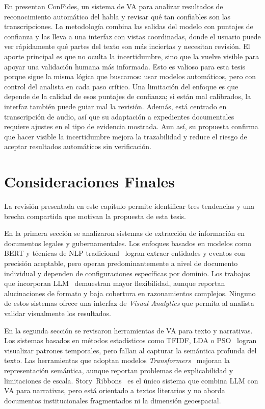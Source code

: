 En \cite{ha2024confides} presentan ConFides, un sistema de \acs{VA} para analizar resultados de reconocimiento automático del habla y revisar qué tan confiables son las transcripciones. La metodología combina las salidas del modelo con puntajes de confianza y las lleva a una interfaz con vistas coordinadas, donde el usuario puede ver rápidamente qué partes del texto son más inciertas y necesitan revisión. El aporte principal es que no oculta la incertidumbre, sino que la vuelve visible para apoyar una validación humana más informada. Esto es valioso para esta tesis porque sigue la misma lógica que buscamos: usar modelos automáticos, pero con control del analista en cada paso crítico. Una limitación del enfoque es que depende de la calidad de esos puntajes de confianza; si están mal calibrados, la interfaz también puede guiar mal la revisión. Además, está centrado en transcripción de audio, así que su adaptación a expedientes documentales requiere ajustes en el tipo de evidencia mostrada. Aun así, su propuesta confirma que hacer visible la incertidumbre mejora la trazabilidad y reduce el riesgo de aceptar resultados automáticos sin verificación.

\section{Consideraciones Finales}

La revisión presentada en este capítulo permite identificar tres tendencias y una brecha compartida que motivan la propuesta de esta tesis.

En la primera sección se analizaron sistemas de extracción de información en documentos legales y gubernamentales. Los enfoques basados en modelos como \acs{BERT} y técnicas de \ac{NLP} tradicional~\cite{zhong-etal-2020-nlp, navas2022whenthefact, yao2022leven, shen2020hierarchical, feng2022legal, joshi2023ucreat} logran extraer entidades y eventos con precisión aceptable, pero operan predominantemente a nivel de documento individual y dependen de configuraciones específicas por dominio. Los trabajos que incorporan \acs{LLM}~\cite{xue2024leec, pereira2023inacia} demuestran mayor flexibilidad, aunque reportan alucinaciones de formato y baja cobertura en razonamientos complejos. Ninguno de estos sistemas ofrece una interfaz de \textit{Visual Analytics} que permita al analista validar visualmente los resultados.

En la segunda sección se revisaron herramientas de \ac{VA} para texto y narrativas. Los sistemas basados en métodos estadísticos como \acs{TFIDF}, \ac{LDA} o \ac{PSO}~\cite{knittel2021, krause2023, chen2019supporting} logran visualizar patrones temporales, pero fallan al capturar la semántica profunda del texto. Las herramientas que adoptan modelos \textit{Transformers}~\cite{rajabiyazdi2024textvista, zhao2023contextwing, lacava2022, resck_legalvis} mejoran la representación semántica, aunque reportan problemas de explicabilidad y limitaciones de escala. Story~Ribbons~\cite{yeh2025storyribbons} es el único sistema que combina \acs{LLM} con \ac{VA} para narrativas, pero está orientado a textos literarios y no aborda documentos institucionales fragmentados ni la dimensión geoespacial.

